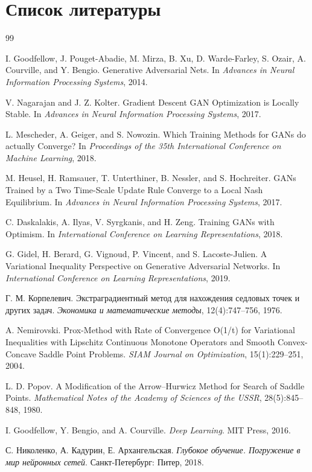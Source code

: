 \documentclass[12pt,a4paper]{article}
\begin{document}
	\section{Список литературы}
	\renewcommand{\refname}{}
	\vspace{-2em}
	\begin{thebibliography}{99}
		
		 I. Goodfellow, J. Pouget-Abadie, M. Mirza, B. Xu, D. Warde-Farley, S. Ozair, A. Courville, and Y. Bengio. Generative Adversarial Nets. In \textit{Advances in Neural Information Processing Systems}, 2014.
		
		 V. Nagarajan and J. Z. Kolter. Gradient Descent GAN Optimization is Locally Stable. In \textit{Advances in Neural Information Processing Systems}, 2017.
		
		 L. Mescheder, A. Geiger, and S. Nowozin. Which Training Methods for GANs do actually Converge? In \textit{Proceedings of the 35th International Conference on Machine Learning}, 2018.
		
		 M. Heusel, H. Ramsauer, T. Unterthiner, B. Nessler, and S. Hochreiter. GANs Trained by a Two Time-Scale Update Rule Converge to a Local Nash Equilibrium. In \textit{Advances in Neural Information Processing Systems}, 2017.
		
		 C. Daskalakis, A. Ilyas, V. Syrgkanis, and H. Zeng. Training GANs with Optimism. In \textit{International Conference on Learning Representations}, 2018.
		
		 G. Gidel, H. Berard, G. Vignoud, P. Vincent, and S. Lacoste-Julien. A Variational Inequality Perspective on Generative Adversarial Networks. In \textit{International Conference on Learning Representations}, 2019.
		
		 Г. М. Корпелевич. Экстраградиентный метод для нахождения седловых точек и других задач. \textit{Экономика и математические методы}, 12(4):747--756, 1976.
		
		 A. Nemirovski. Prox-Method with Rate of Convergence O(1/t) for Variational Inequalities with Lipschitz Continuous Monotone Operators and Smooth Convex-Concave Saddle Point Problems. \textit{SIAM Journal on Optimization}, 15(1):229--251, 2004.
		
		 L. D. Popov. A Modification of the Arrow--Hurwicz Method for Search of Saddle Points. \textit{Mathematical Notes of the Academy of Sciences of the USSR}, 28(5):845--848, 1980.
		
		 I. Goodfellow, Y. Bengio, and A. Courville. \textit{Deep Learning}. MIT Press, 2016.
		
		 С. Николенко, А. Кадурин, Е. Архангельская. \textit{Глубокое обучение. Погружение в мир нейронных сетей}. Санкт-Петербург: Питер, 2018.
		
	\end{thebibliography}
	
\end{document}
